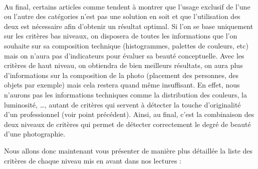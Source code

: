 \documentclass[11pt, french]{report-rd-info}
\begin{document}
\paragraph*{}
Au final, certains articles comme \cite{Ke} tendent à montrer que l'usage exclusif de l'une ou l'autre des catégories n’est pas une solution en soit et que l’utilisation des deux est nécessaire afin d’obtenir un résultat optimal. Si l’on se base uniquement sur les critères bas niveaux, on disposera de toutes les informations que l’on souhaite sur sa composition technique (histogrammes, palettes de couleurs, etc) mais on n’aura pas d’indicateurs pour évaluer sa beauté conceptuelle. Avec les critères de haut niveau, on obtiendra de bien meilleurs résultats, on aura plus d’informations sur la composition de la photo (placement des personnes, des objets par exemple) mais cela restera quand même insuffisant. En effet, nous n’aurons pas les informations techniques comme la distribution des couleurs, la luminosité, \ldots, autant de critères qui servent à détecter la touche d’originalité d’un professionnel (voir point précédent). 
Ainsi, au final, c’est la combinaison des deux niveaux de critères qui permet de détecter correctement le degré de beauté d’une photographie.

Nous allons donc maintenant vous présenter de manière plus détaillée la liste des critères de chaque niveau mis en avant dans nos lectures :
\end{document}
